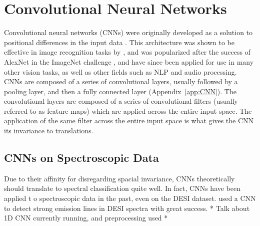 \section{Convolutional Neural Networks}
\label{sec:CNN}
Convolutional neural networks (CNNs) were originally developed as a solution 
to positional differences in the input data \parencite{fukushima1979}. This architecture 
was shown to be effective in image recognition tasks by \textcite{lecun2004}, and 
was popularized after the success of AlexNet in the 
ImageNet challenge \textcite{krizhevsky2012}, and have since been applied for use in 
many other vision tasks, as well as other fields such as NLP and audio processing. 
CNNs are composed of a series of convolutional layers, usually followed by a 
pooling layer, and then a fully connected layer (Appendix~\ref{app:CNN}). The convolutional layers are 
composed of a series of convolutional filters (usually referred to as feature maps)
which are applied across the entire input space. The application of the same filter 
across the entire input space is what gives the CNN its invariance to translations.

\subsection{CNNs on Spectroscopic Data}
\label{sec:CNNspectra}
Due to their affinity for disregarding spacial invariance, CNNs theoretically should 
translate to spectral classification quite well. In fact, CNNs have been applied t
o spectroscopic data in the past, even on the DESI dataset. 
\textcite{parks2018} used a CNN to detect strong emission lines in DESI spectra with 
great success. * Talk about 1D CNN currently running, and preprocessing used *

